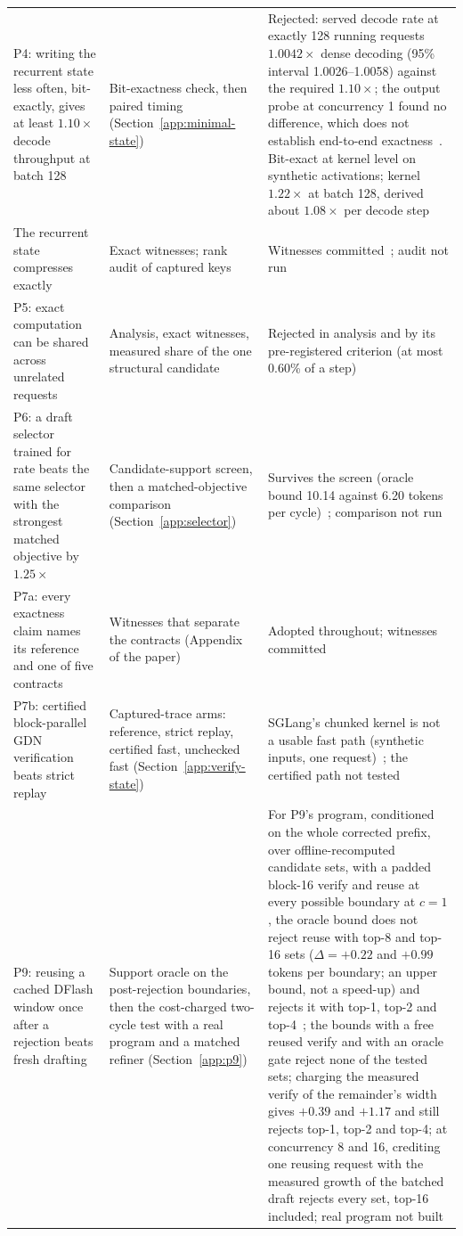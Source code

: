 {\begin{longtable}{@{}P{5.2cm}P{4.6cm}P{6.5cm}@{}}
P4: writing the recurrent state less often, bit-exactly, gives at least $1.10\times$ decode throughput at batch 128 & Bit-exactness check, then paired timing (Section~\ref{app:minimal-state}) & Rejected: served decode rate at exactly 128 running requests $1.0042\times$ dense decoding (95\% interval 1.0026--1.0058) against the required $1.10\times$; the output probe at concurrency 1 found no difference, which does not establish end-to-end exactness~. Bit-exact at kernel level on synthetic activations; kernel $1.22\times$ at batch 128, derived about $1.08\times$ per decode step~\\
\quad The recurrent state compresses exactly & Exact witnesses; rank audit of captured keys & Witnesses committed~; audit not run\\
P5: exact computation can be shared across unrelated requests & Analysis, exact witnesses, measured share of the one structural candidate & Rejected in analysis and by its pre-registered criterion (at most 0.60\% of a step)~\\
P6: a draft selector trained for rate beats the same selector with the strongest matched objective by $1.25\times$ & Candidate-support screen, then a matched-objective comparison (Section~\ref{app:selector}) & Survives the screen (oracle bound 10.14 against 6.20 tokens per cycle)~; comparison not run\\
P7a: every exactness claim names its reference and one of five contracts & Witnesses that separate the contracts (Appendix~ of the paper) & Adopted throughout; witnesses committed~\\
P7b: certified block-parallel GDN verification beats strict replay & Captured-trace arms: reference, strict replay, certified fast, unchecked fast (Section~\ref{app:verify-state}) & SGLang's chunked kernel is not a usable fast path (synthetic inputs, one request)~; the certified path not tested\\
P9: reusing a cached DFlash window once after a rejection beats fresh drafting & Support oracle on the post-rejection boundaries, then the cost-charged two-cycle test with a real program and a matched refiner (Section~\ref{app:p9}) & For P9's program, conditioned on the whole corrected prefix, over offline-recomputed candidate sets, with a padded block-16 verify and reuse at every possible boundary at $c=1$, the oracle bound does not reject reuse with top-8 and top-16 sets ($\Delta=+0.22$ and $+0.99$ tokens per boundary; an upper bound, not a speed-up) and rejects it with top-1, top-2 and top-4~; the bounds with a free reused verify and with an oracle gate reject none of the tested sets; charging the measured verify of the remainder's width gives $+0.39$ and $+1.17$ and still rejects top-1, top-2 and top-4; at concurrency 8 and 16, crediting one reusing request with the measured growth of the batched draft rejects every set, top-16 included; real program not built\\

\end{longtable}}
